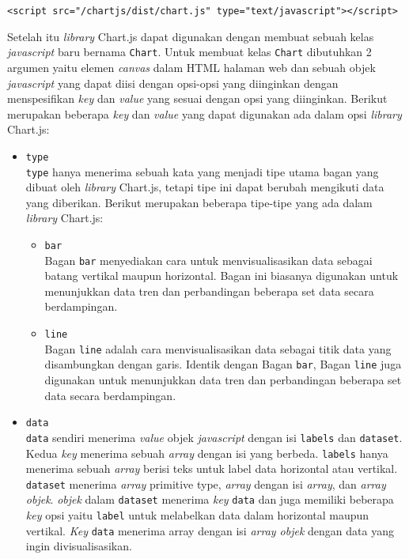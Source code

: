\begin{center}
	\verb|<script src="/chartjs/dist/chart.js" type="text/javascript"></script>|
\end{center}

Setelah itu \textit{library} Chart.js dapat digunakan dengan membuat sebuah kelas \textit{javascript} baru bernama \verb|Chart|. Untuk membuat kelas \verb|Chart| dibutuhkan 2 argumen yaitu elemen \textit{canvas} dalam HTML halaman web dan sebuah objek \textit{javascript} yang dapat diisi dengan opsi-opsi yang diinginkan dengan menspesifikan \textit{key} dan \textit{value} yang sesuai dengan opsi yang diinginkan. Berikut merupakan beberapa \textit{key} dan \textit{value} yang dapat digunakan ada dalam opsi \textit{library} Chart.js:

\begin{itemize}
	\item \verb|type| \\
	\verb|type| hanya menerima sebuah kata yang menjadi tipe utama bagan yang dibuat oleh \textit{library} Chart.js, tetapi tipe ini dapat berubah mengikuti data yang diberikan. Berikut merupakan beberapa tipe-tipe yang ada dalam \textit{library} Chart.js:
	\begin{itemize}
		\item \verb|bar| \\
		Bagan \verb|bar| menyediakan cara untuk menvisualisasikan data sebagai batang vertikal maupun horizontal. Bagan ini biasanya digunakan untuk menunjukkan data tren dan perbandingan beberapa set data secara berdampingan.
		\item \verb|line| \\
		Bagan \verb|line| adalah cara menvisualisasikan data sebagai titik data yang disambungkan dengan garis. Identik dengan Bagan \verb|bar|, Bagan \verb|line| juga digunakan untuk menunjukkan data tren dan perbandingan beberapa set data secara berdampingan.
	\end{itemize}

	\item \verb|data| \\
	\verb|data| sendiri menerima \textit{value} objek \textit{javascript} dengan isi \verb|labels| dan \verb|dataset|. Kedua \textit{key} menerima sebuah \textit{array} dengan isi yang berbeda. \verb|labels| hanya menerima sebuah \textit{array} berisi teks untuk label data horizontal atau vertikal. \verb|dataset| menerima \textit{array} primitive type, \textit{array} dengan isi \textit{array}, dan \textit{array objek}. \textit{objek} dalam \verb|dataset| menerima \textit{key} \verb|data| dan juga memiliki beberapa \textit{key} opsi yaitu \verb|label| untuk melabelkan data dalam horizontal maupun vertikal. \textit{Key} \verb|data| menerima array dengan isi \textit{array objek} dengan data yang ingin divisualisasikan.


\end{itemize}
